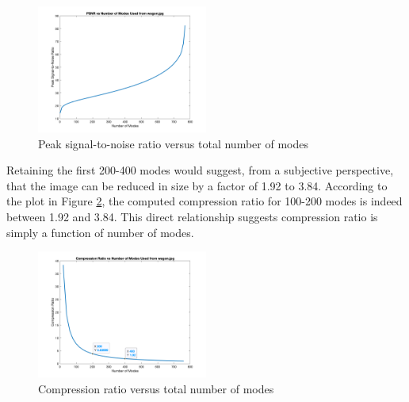\documentclass[conference]{IEEEtran}
\begin{document}
    \begin{figure}[t]
    \includegraphics[width=0.5\textwidth]{snrvsr_wagon_rgb}
    \caption{Peak signal-to-noise ratio versus total number of modes}
    \label{fig:psnrvsr_wagon}
    \end{figure}
    
    Retaining the first 200-400 modes would suggest, from a subjective perspective, that the image can be reduced in size by a factor of 1.92 to 3.84. According to the plot in Figure \ref{fig:comprvsr}, the computed compression ratio for 100-200 modes is indeed between 1.92 and 3.84. This direct relationship suggests compression ratio is simply a function of number of modes.

    \begin{figure}[t]
    \includegraphics[width=0.5\textwidth]{comprVsModes_rgb}
    \caption{Compression ratio versus total number of modes}
    \label{fig:comprvsr}
    \end{figure}


\end{document}
